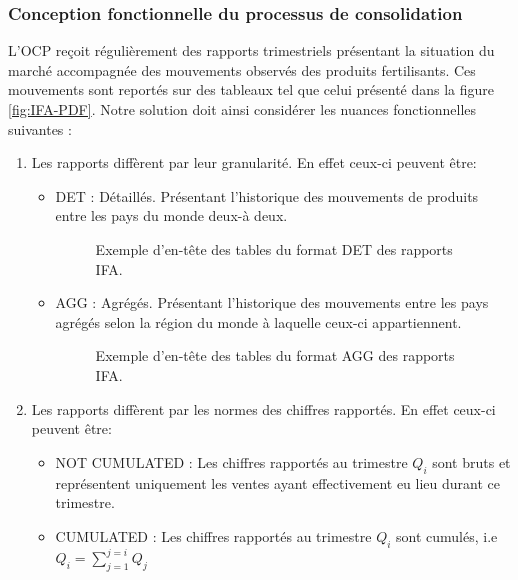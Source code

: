 	\subsubsection{Conception fonctionnelle du processus de consolidation}
	L'OCP reçoit régulièrement des rapports trimestriels présentant la situation du marché accompagnée des mouvements observés des produits fertilisants. Ces mouvements sont reportés sur des tableaux tel que celui présenté dans la figure \ref{fig:IFA-PDF}. Notre solution doit ainsi considérer les nuances fonctionnelles suivantes :\newpage
	\begin{enumerate}
	\item Les rapports diffèrent par leur granularité. En effet ceux-ci peuvent être:
		\begin{itemize}
		\item DET : Détaillés. Présentant l'historique des mouvements de produits entre les pays du monde deux-à deux.
		\begin{figure}[h]
					    		\centering
					    		\caption{Exemple d'en-tête des tables du format DET des rapports IFA.}
				\end{figure}
		\item AGG : Agrégés. Présentant l'historique des mouvements entre les pays agrégés selon la région du monde à laquelle ceux-ci appartiennent.
		\begin{figure}[h]
			    		\centering
			    		\caption{Exemple d'en-tête des tables du format  AGG des rapports IFA.}
		\end{figure}
		\end{itemize}
	\item Les rapports diffèrent par les normes des chiffres rapportés. En effet ceux-ci peuvent être:
		\begin{itemize}
		\item NOT CUMULATED : Les chiffres rapportés au trimestre ${Q_i}$ sont bruts et représentent uniquement les ventes ayant effectivement eu lieu durant ce trimestre.
		\item CUMULATED : Les chiffres rapportés au trimestre ${Q_i}$ sont cumulés, i.e ${Q_i = \sum_{j=1}^{j=i} Q_j}$

\end{itemize}
\end{enumerate}
